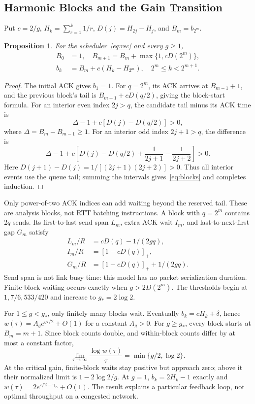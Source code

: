 \documentclass[conference,letterpaper]{IEEEtran}
\newtheorem{proposition}{Proposition}
\begin{document}
\subsection{Harmonic Blocks and the Gain Transition}
Put $c=2/g$, $H_k=\sum_{r=1}^k1/r$, $D(j)=H_{2j}-H_j$, and $B_m=b_{2^m}$.
\begin{proposition}
For the scheduler~\eqref{eq:rec} and every $g\ge1$,
\begin{align}
B_0&=1,\quad B_{m+1}=B_m+\max\{1,cD(2^m)\},\\
b_k&=B_m+c(H_k-H_{2^m}),\quad2^m\le k<2^{m+1}.
\label{eq:blocks}
\end{align}
\end{proposition}
\begin{proof}
The initial ACK gives $b_1=1$. For $q=2^m$, its ACK arrives at $B_{m-1}+1$, and the previous block's tail is $B_{m-1}+cD(q/2)$, giving the block-start formula. For an interior even index $2j>q$, the candidate tail minus its ACK time is
\[
\Delta-1+c[D(j)-D(q/2)]>0,
\]
where $\Delta=B_m-B_{m-1}\ge1$. For an interior odd index $2j+1>q$, the difference is
\[
\Delta-1+c\left[D(j)-D(q/2)+\frac1{2j+1}-\frac1{2j+2}\right]>0.
\]
Here $D(j+1)-D(j)=1/[(2j+1)(2j+2)]>0$. Thus all interior events use the queue tail; summing the intervals gives~\eqref{eq:blocks} and completes induction.
\end{proof}

Only power-of-two ACK indices can add waiting beyond the reserved tail. These are analysis blocks, not RTT batching instructions. A block with $q=2^m$ contains $2q$ sends. Its first-to-last send span $L_m$, extra ACK wait $I_m$, and last-to-next-first gap $G_m$ satisfy
\begin{align}
L_m/R&=cD(q)-1/(2gq),\\
I_m/R&=[1-cD(q)]_+,\\
G_m/R&=[1-cD(q)]_++1/(2gq).
\end{align}
Send span is not link busy time: this model has no packet serialization duration. Finite-block waiting occurs exactly when $g>2D(2^m)$. The thresholds begin at $1,7/6,533/420$ and increase to $g_*=2\log2$.

For $1\le g<g_*$, only finitely many blocks wait. Eventually $b_k=cH_k+\delta$, hence $w(\tau)=A_g e^{g\tau/2}+O(1)$ for a constant $A_g>0$. For $g\ge g_*$, every block starts at $B_m=m+1$. Since block counts double, and within-block counts differ by at most a constant factor,
\begin{equation}
\boxed{\lim_{\tau\to\infty}\frac{\log w(\tau)}{\tau}
=\min\{g/2,\log2\}.}
\end{equation}
At the critical gain, finite-block waits stay positive but approach zero; above it their normalized limit is $1-2\log2/g$. At $g=1$, $b_k=2H_k-1$ exactly and $w(\tau)=2e^{\tau/2-\gamma_E}+O(1)$. The result explains a particular feedback loop, not optimal throughput on a congested network.
\end{document}
